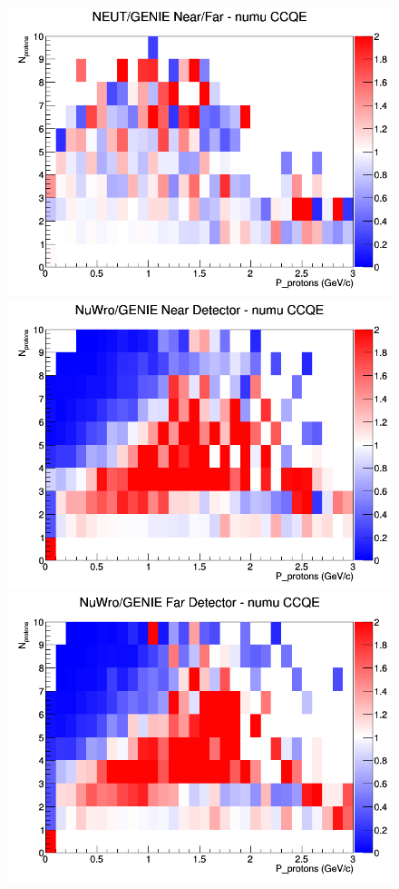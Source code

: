 \documentclass[12pt]{article}
\begin{document}
\begin{figure}[h]
\endminipage
{}
\includegraphics[width=\linewidth]{N_P/nominal/protons/ratios/CCQE_NEUT_GENIE_numu_NF_N_P.png}
\endminipage
\newline
{}
\includegraphics[width=\linewidth]{N_P/nominal/protons/ratios/CCQE_NuWro_GENIE_numu_near_N_P.png}
\endminipage
{}
\includegraphics[width=\linewidth]{N_P/nominal/protons/ratios/CCQE_NuWro_GENIE_numu_far_N_P.png}

\end{figure}
\end{document}
